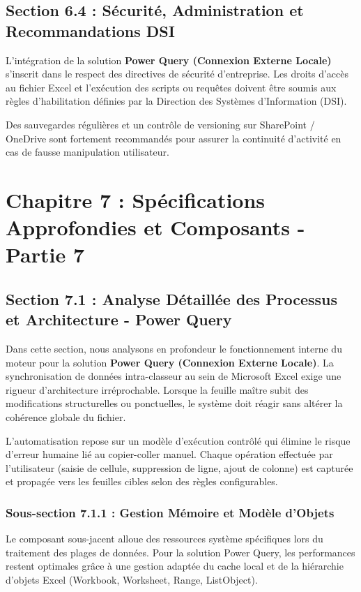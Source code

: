 \documentclass[12pt,a4paper]{report}
\begin{document}
\section{Section 6.4 : Sécurité, Administration et Recommandations DSI}
L'intégration de la solution \textbf{Power Query (Connexion Externe Locale)} s'inscrit dans le respect des directives de sécurité d'entreprise. Les droits d'accès au fichier Excel et l'exécution des scripts ou requêtes doivent être soumis aux règles d'habilitation définies par la Direction des Systèmes d'Information (DSI).

Des sauvegardes régulières et un contrôle de versioning sur SharePoint / OneDrive sont fortement recommandés pour assurer la continuité d'activité en cas de fausse manipulation utilisateur.


\chapter{Chapitre 7 : Spécifications Approfondies et Composants - Partie 7}

\section{Section 7.1 : Analyse Détaillée des Processus et Architecture - Power Query}
Dans cette section, nous analysons en profondeur le fonctionnement interne du moteur pour la solution \textbf{Power Query (Connexion Externe Locale)}. La synchronisation de données intra-classeur au sein de Microsoft Excel exige une rigueur d'architecture irréprochable. Lorsque la feuille maître subit des modifications structurelles ou ponctuelles, le système doit réagir sans altérer la cohérence globale du fichier.

L'automatisation repose sur un modèle d'exécution contrôlé qui élimine le risque d'erreur humaine lié au copier-coller manuel. Chaque opération effectuée par l'utilisateur (saisie de cellule, suppression de ligne, ajout de colonne) est capturée et propagée vers les feuilles cibles selon des règles configurables.


\subsection{Sous-section 7.1.1 : Gestion Mémoire et Modèle d'Objets}
Le composant sous-jacent alloue des ressources système spécifiques lors du traitement des plages de données. Pour la solution Power Query, les performances restent optimales grâce à une gestion adaptée du cache local et de la hiérarchie d'objets Excel (Workbook, Worksheet, Range, ListObject).
\end{document}
